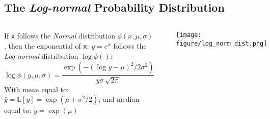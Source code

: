 \documentclass[10pt]{beamer}\usepackage[]{graphicx}\usepackage[]{color}
\makeatletter
\newenvironment{kframe}{%
 \def\at@end@of@kframe{}%
 \ifinner\ifhmode%
  \def\at@end@of@kframe{\end{minipage}}%
  \begin{minipage}{\columnwidth}%
 \fi\fi%
 \def\FrameCommand##1{\hskip\@totalleftmargin \hskip-\fboxsep
 \colorbox{shadecolor}{##1}\hskip-\fboxsep
     \hskip-\linewidth \hskip-\@totalleftmargin \hskip\columnwidth}%
 \MakeFramed {\advance\hsize-\width
   \@totalleftmargin\z@ \linewidth\hsize
   \@setminipage}}%
 {\par\unskip\endMakeFramed%
 \at@end@of@kframe}
\newenvironment{knitrout}{}{} %
\makeatother
\begin{document}
\subsection{The \protect\emph{Log-normal} Probability Distribution}
\begin{frame}[fragile,t]{\subsecname}
\vspace{-1em}
\begin{block}{}
  \begin{columns}[T]
      If \texttt{x} follows the \emph{Normal} distribution $\phi(x, \mu, \sigma)$, then the exponential of \texttt{x}: $y = e^x$ follows the \emph{Log-normal} distribution $\log\phi()$:
      \begin{displaymath}
        \log\phi(y, \mu, \sigma) = \frac{\exp(-(\log{y} - \mu)^2/2 \sigma^2)}{y \sigma \, \sqrt{2 \pi}}
      \end{displaymath}
      With mean equal to: $\bar{y} = \mathbb{E}[y] = \exp(\mu + \sigma^2/2)$, and median equal to: $\tilde{y} = \exp(\mu)$
\begin{knitrout}\tiny
{}\color{fgcolor}\begin{kframe}
\begin{verbatim}
> # Standard deviations of log-normal distribution
> sig_mas <- c(0.5, 1, 1.5)
> # Create plot colors
> col_ors <- c("black", "red", "blue")
> # Plot all curves
> for (in_dex in 1:NROW(sig_mas)) {
+   curve(expr=dlnorm(x, sdlog=sig_mas[in_dex]),
+   type="l", lwd=2, xlim=c(0, 3),
+   xlab="", ylab="", col=col_ors[in_dex],
+   add=as.logical(in_dex-1))
+ }  # end for
\end{verbatim}
\end{kframe}
\end{knitrout}
      \vspace{-1em}
      \texttt{[image: figure/log\_norm\_dist.png]}
      \vspace{-1em}
\begin{knitrout}\tiny
{}\color{fgcolor}\begin{kframe}
\begin{verbatim}
> # Add title and legend
> title(main="Log-normal Distributions", line=0.5)
> legend("topright", inset=0.05, title="Sigmas",
+  paste("sigma", sig_mas, sep="="),
+  cex=0.8, lwd=2, lty=rep(1, NROW(sig_mas)),
+  col=col_ors)
\end{verbatim}
\end{kframe}
\end{knitrout}
  \end{columns}
\end{block}

\end{frame}
\end{document}
